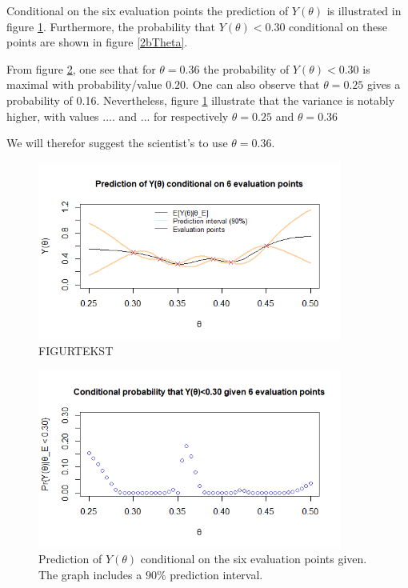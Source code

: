 Conditional on the six evaluation points the prediction of $Y(\theta)$ is illustrated in figure \ref{2cPred}. Furthermore, the probability that $Y(\theta)<0.30$ conditional on these points are shown in figure \ref{2bTheta}. 

From figure \ref{2cTheta}, one see that for $\theta = 0.36$ the probability of $Y(\theta)<0.30$ is maximal with probability/value $0.20$. One can also observe that $\theta = 0.25$ gives a probability of 0.16. Nevertheless, figure \ref{2cPred} illustrate that the variance is notably higher, with values .... and ... for respectively $\theta = 0.25$ and  $\theta = 0.36$

We will therefor suggest the scientist's to use $\theta = 0.36$. 

\begin{figure}
    \centering
    \includegraphics[width=100mm]{2cPred.png}
    \caption{ FIGURTEKST }
    \label{2cPred}
\end{figure}
\begin{figure}
    \centering
    \includegraphics[width=100mm]{2ctheta.png}
    \caption{Prediction of $Y(\theta)$ conditional on the six evaluation points given. The graph includes a $90\%$ prediction interval. }
    \label{2cTheta}
\end{figure}